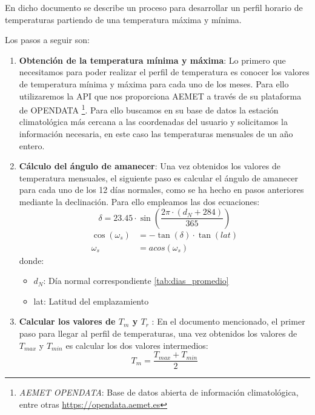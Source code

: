 En dicho documento se describe un proceso para desarrollar un perfil horario de temperaturas partiendo de una temperatura máxima y mínima.

Los pasos a seguir son:

\begin{enumerate}
\item \textbf{Obtención de la temperatura mínima y máxima}: Lo primero que necesitamos para poder realizar el perfil de temperatura es conocer los valores de temperatura mínima y máxima para cada uno de los meses. Para ello utilizaremos la API que nos proporciona AEMET a través de su plataforma de OPENDATA \footnote{\textit{AEMET OPENDATA}: Base de datos abierta de información climatológica, entre otras \url{https://opendata.aemet.es}}. Para ello buscamos en su base de datos la estación climatológica más cercana a las coordenadas del usuario y solicitamos la información necesaria, en este caso las temperaturas mensuales de un año entero.
\item \textbf{Cálculo del ángulo de amanecer}: Una vez obtenidos los valores de temperatura mensuales, el siguiente paso es calcular el ángulo de amanecer para cada uno de los 12 días normales, como se ha hecho en pasos anteriores mediante la declinación. Para ello empleamos las dos ecuaciones:
\begin{equation}
\delta = 23.45 \cdot \sin\left(\frac{2\pi \cdot (d_N + 284) }{365}\right)
\end{equation}
\begin{equation}
\begin{align}
\cos(\omega_s) &= -\tan(\delta) \cdot \tan(lat)\\
\omega_s &= acos(\omega_s)
\end{align}
\end{equation}
donde:
\begin{itemize}
\item $d_N$: Día normal correspondiente \ref{tab:dias_promedio}
\item lat: Latitud del emplazamiento
\end{itemize}
\item \textbf{Calcular los valores de $T_m$ y $T_r$ }: En el documento mencionado, el primer paso para llegar al perfil de temperaturas, una vez obtenidos los valores de $T_{max}$ y $T_{min}$ es calcular los dos valores intermedios:
\begin{equation}
T_m = \frac{T_{max} + T_{min} }{2}
\end{equation}


\end{enumerate}
